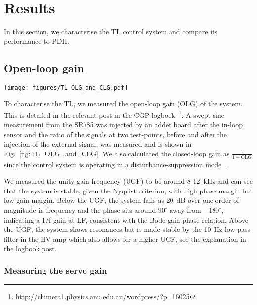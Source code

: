 \documentclass[aps,pra,superscriptaddress,reprint,nofootinbib]{revtex4-1}
\begin{document}
\section{Results}
\label{sec:results}

In this section, we characterise the TL control system and compare its performance to PDH.

\subsection{Open-loop gain}
\label{sec:OLG}

\begin{figure*}
	\texttt{[image: figures/TL\_OLG\_and\_CLG.pdf]}
	\caption{SR785 measurements from 2021-01-05 of Bode amplitude and phase for the transfer function of the TL control system (i.e.\ the OLG) with 10~mV swept sine injected after the in-loop sensor. Also showing the closed-loop gain calculated as $\mathrm{CLG} = \frac{1}{1+\mathrm{OLG}}$ and the unity-gain frequency (UGF) where the gain is 0~dB. The phase measurements are relative to $-180^\circ$.}
	\label{fig:TL_OLG_and_CLG}
\end{figure*}

To characterise the TL, we measured the open-loop gain (OLG) of the system. This is detailed in the relevant post in the CGP logbook~\footnote{\url{http://chimera1.physics.anu.edu.au/wordpress/?p=16025}}. A swept sine measurement from the SR785 was injected by an adder board after the in-loop sensor and the ratio of the signals at two test-points, before and after the injection of the external signal, was measured and is shown in Fig.~\ref{fig:TL_OLG_and_CLG}. We also calculated the closed-loop gain as $\frac{1}{1+\mathrm{OLG}}$ since the control system is operating in a disturbance-suppression mode~\cite{FCS:2000}.

We measured the unity-gain frequency (UGF) to be around 8-12~kHz and can see that the system is stable, given the Nyquist criterion, with high phase margin but low gain margin. Below the UGF, the system falls as 20~dB over one order of magnitude in frequency and the phase sits around $90^\circ$ away from $-180^\circ$, indicating a 1/f gain at LF, consistent with the Bode gain-phase relation. Above the UGF, the system shows resonances but is made stable by the 10~Hz low-pass filter in the HV amp which also allows for a higher UGF, see the explanation in the logbook post.

\subsubsection{Measuring the servo gain}
\end{document}
